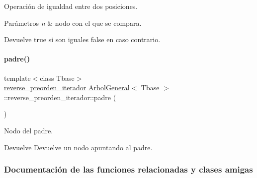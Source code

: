 Operación de igualdad entre dos posiciones. 


\begin{DoxyParams}{Parámetros}
{\em n} & nodo con el que se compara. \\
\hline
\end{DoxyParams}
\begin{DoxyReturn}{Devuelve}
true si son iguales false en caso contrario. 
\end{DoxyReturn}
\hypertarget{classArbolGeneral_1_1reverse__preorden__iterador_a3b80852dfc52aba8b888246f81c8ca6d}{}\label{classArbolGeneral_1_1reverse__preorden__iterador_a3b80852dfc52aba8b888246f81c8ca6d} 
\paragraph{\texorpdfstring{padre()}{padre()}}
{\footnotesize\ttfamily template$<$class Tbase$>$ \\
\hyperlink{classArbolGeneral_1_1reverse__preorden__iterador}{reverse\+\_\+preorden\+\_\+iterador} \hyperlink{classArbolGeneral}{Arbol\+General}$<$ Tbase $>$\+::reverse\+\_\+preorden\+\_\+iterador\+::padre (\begin{DoxyParamCaption}{ }\end{DoxyParamCaption})\hspace{0.3cm}{\ttfamily [inline]}}



Nodo del padre. 

\begin{DoxyReturn}{Devuelve}
Devuelve un nodo apuntando al padre. 
\end{DoxyReturn}


\subsubsection{Documentación de las funciones relacionadas y clases amigas}
\hypertarget{classArbolGeneral_1_1reverse__preorden__iterador_a9c06e31b7c3e0d4ee5b03003d32935a5}{}\label{classArbolGeneral_1_1reverse__preorden__iterador_a9c06e31b7c3e0d4ee5b03003d32935a5} 
